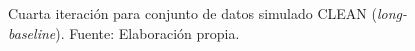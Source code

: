 \begin{figure}[!ht]
 \caption[Cuarta iteración para conjunto de datos simulado CLEAN (\textit{long-baseline})]{Cuarta iteración para conjunto de datos simulado CLEAN (\textit{long-baseline}). Fuente: Elaboración propia.}
 \label{fig:phasecal_4iter}
\end{figure}

